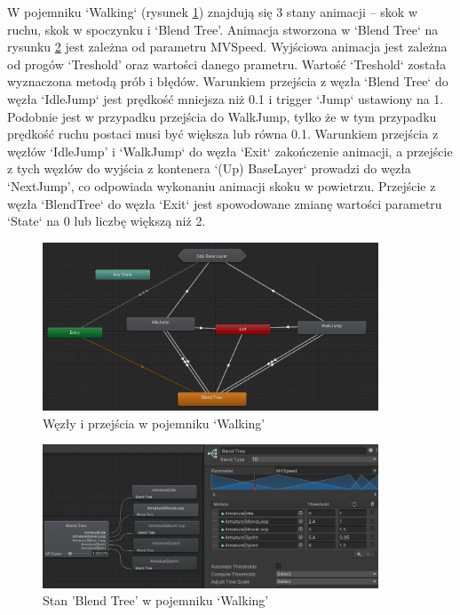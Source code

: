 \documentclass[12pt,twoside]{article}
\begin{document}
W pojemniku `Walking` (rysunek \ref{Hero:Aniamtor:Walking}) znajdują się 3 stany
animacji -- skok w ruchu, skok w spoczynku i ‘Blend Tree’.  Animacja stworzona w
`Blend Tree` na rysunku \ref{Hero:Aniamtor:WalkingBlendTree} jest zależna od
parametru MVSpeed. Wyjściowa animacja jest zależna od progów ‘Treshold’ oraz
wartości danego prametru. Wartość `Treshold` została wyznaczona metodą prób i
błędów. Warunkiem przejścia z węzła `Blend Tree` do węzła `IdleJump` jest
prędkość mniejsza niż 0.1 i trigger `Jump` ustawiony na 1. Podobnie jest w
przypadku przejścia do WalkJump, tylko że w tym przypadku prędkość ruchu postaci
musi być większa lub równa 0.1. Warunkiem przejścia z węzłów ‘IdleJump’ i
`WalkJump` do węzła `Exit` zakończenie animacji, a przejście z tych węzłów do
wyjścia z kontenera `(Up) BaseLayer` prowadzi do węzła ‘NextJump’, co odpowiada
wykonaniu animacji skoku w powietrzu. Przejście z węzła `BlendTree` do węzła
`Exit` jest spowodowane zmianę wartości parametru `State` na 0 lub liczbę
większą niż 2. 
\begin{figure}[!ht]
    \centering
	\includegraphics[width=10cm]{RealizacjaProjektu/UnityPictires/Animator/Player1_Animator_Walking.jpg}
	\caption{Węzły i przejścia w pojemniku `Walking'}
    \label{Hero:Aniamtor:Walking}
\end{figure}
\begin{figure}[!ht]
    \centering
	\includegraphics[width=10cm]{RealizacjaProjektu/UnityPictires/Animator/Player1_Animator_Walking_blendTree.jpg}
	\caption{Stan 'Blend Tree' w pojemniku `Walking'}
    \label{Hero:Aniamtor:WalkingBlendTree}
\end{figure}
\end{document}
